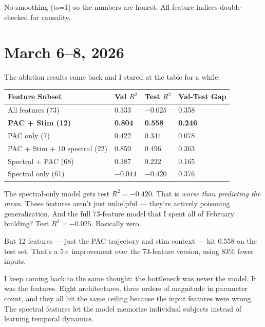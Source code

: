 \documentclass[11pt,letterpaper]{article}
\begin{document}
No smoothing (ts=1) so the numbers are honest. All feature indices double-checked for
causality.

\section*{March 6--8, 2026}

The ablation results came back and I stared at the table for a while:

\vspace{0.5em}
\begin{tabular}{@{}llll@{}}
\toprule
\textbf{Feature Subset}           & \textbf{Val $R^2$} & \textbf{Test $R^2$} & \textbf{Val-Test Gap} \\
\midrule
All features (73)                 & 0.333              & $-0.025$            & 0.358 \\
\textbf{PAC + Stim (12)}          & \textbf{0.804}     & \textbf{0.558}      & \textbf{0.246} \\
PAC only (7)                      & 0.422              & 0.344               & 0.078 \\
PAC + Stim + 10 spectral (22)     & 0.859              & 0.496               & 0.363 \\
Spectral + PAC (68)               & 0.387              & 0.222               & 0.165 \\
Spectral only (61)                & $-0.044$           & $-0.420$            & 0.376 \\
\bottomrule
\end{tabular}
\vspace{0.5em}

The spectral-only model gets test $R^2 = -0.420$. That is \textit{worse than predicting the
mean}. These features aren't just unhelpful --- they're actively poisoning generalization.
And the full 73-feature model that I spent all of February building? Test $R^2 = -0.025$.
Basically zero.

But 12 features --- just the PAC trajectory and stim context --- hit 0.558 on the test set.
That's a 5$\times$ improvement over the 73-feature version, using 83\% fewer inputs.

I keep coming back to the same thought: the bottleneck was never the model. It was the
features. Eight architectures, three orders of magnitude in parameter count, and they all hit
the same ceiling because the input features were wrong. The spectral features let the model
memorize individual subjects instead of learning temporal dynamics.
\end{document}
